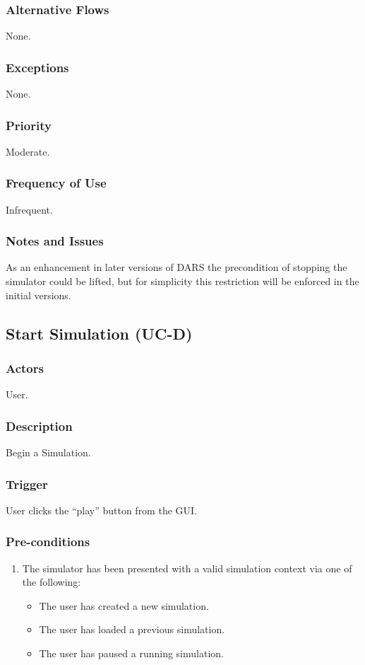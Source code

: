 \documentclass[a4paper,11pt,titlepage]{article}
\begin{document}
\subsubsection{Alternative Flows}
None.


\subsubsection{Exceptions}
None.

\subsubsection{Priority}
Moderate.

\subsubsection{Frequency of Use}
Infrequent.

\subsubsection{Notes and Issues}
As an enhancement in later versions of DARS the precondition of stopping the simulator could be lifted, but for simplicity this restriction will be enforced in the initial versions.

\subsection{Start Simulation (UC-D)}
\subsubsection{Actors}
User.
\subsubsection{Description}
Begin a Simulation.

\subsubsection{Trigger}
User clicks the ``play'' button from the GUI.

\subsubsection{Pre-conditions}

\begin{enumerate}
  \item The simulator has been presented with a valid simulation context via one of the following:
  \begin{itemize}
    \item The user has created a new simulation.
    \item The user has loaded a previous simulation.
    \item The user has paused a running simulation.
  \end{itemize}
\end{enumerate}
\end{document}
